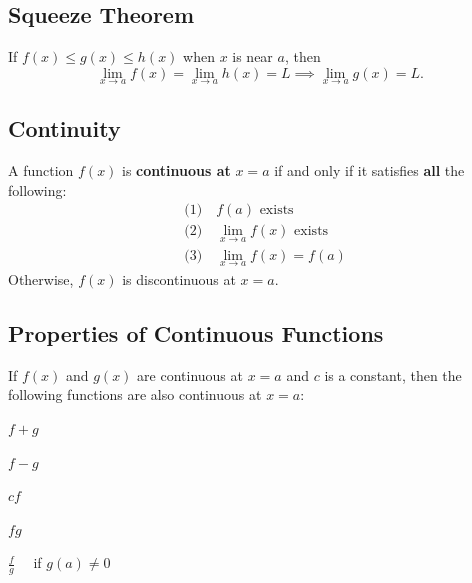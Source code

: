 \documentclass[a4paper,11pt]{article}
\begin{document}


\subsection{Squeeze Theorem}

\begin{tcolorbox}
    If $f(x) \leq g(x) \leq h(x)$ when $x$ is near $a$, then
    \[ 
    \lim\limits_{x \to a} f(x) = \lim\limits_{x \to a} h(x) = L \implies \lim\limits_{x \to a} g(x) = L.
    \]
\end{tcolorbox}




\subsection{Continuity}

\begin{tcolorbox}
    A function $f(x)$ is \textbf{continuous at} $x = a$ if and only if it satisfies \textbf{all} the following:
    \[
    \begin{aligned}
        &\text{(1)} \quad f(a) \text{ exists} \\  
        &\text{(2)} \quad \lim\limits_{x \to a} f(x) \text{ exists} \\  
        &\text{(3)} \quad \lim\limits_{x \to a} f(x) = f(a)  
    \end{aligned}
    \]
    Otherwise, $f(x)$ is discontinuous at $x = a$.
\end{tcolorbox}




\subsection{Properties of Continuous Functions}


\begin{tcolorbox}
    If $f(x)$ and $g(x)$ are continuous at $x = a$ and $c$ is a constant, then the following functions are also continuous at $x = a$:  
    \begin{enumerate}
        \begin{multicols}{3}
            \item $f + g$
            \item $f - g$
            \item $cf$
        \end{multicols}
        \begin{multicols}{3}
            \item $fg$
            \item $\frac{f}{g} \quad$ if $g(a) \neq 0$
        \end{multicols}
    \end{enumerate}
\end{tcolorbox}
\end{document}
